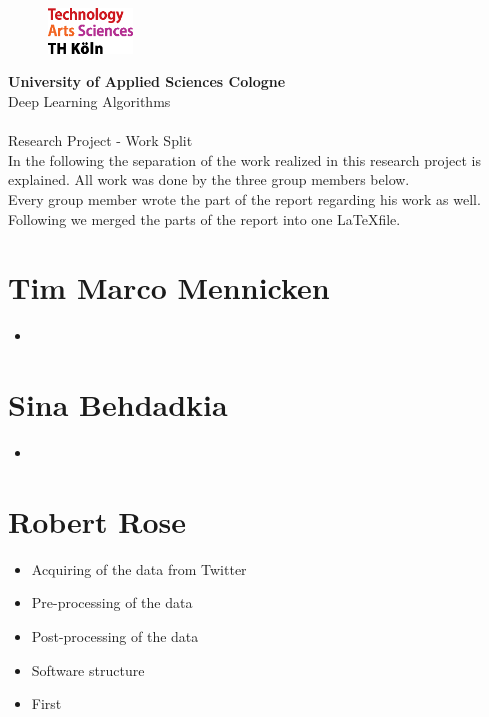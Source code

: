 \documentclass[a4paper,11pt,oneside]{article}
\begin{document}
  \pagestyle{fancy} %
  \fancyhead{}
  \fancyhf{}
  \renewcommand{\headrulewidth}{0pt}
  \renewcommand{\footrulewidth}{0.4pt}
  \fancyfoot[R] {}
  \begin{figure}
    \includegraphics[width=0.2\textwidth]{sources/logo_TH-Koeln_CMYK_22pt}
  \end{figure}
  \Large
  \textbf{University of Applied Sciences Cologne}\\
  Deep Learning Algorithms\\
  \\
  \large
  Research Project - Work Split\\

In the following the separation of the work realized in this research project is explained. All work was done by the three group members below.\\
Every group member wrote the part of the report regarding his work as well. Following we merged the parts of the report into one \LaTeX file.

\section*{Tim Marco Mennicken}

\begin{itemize}
\item
\end{itemize}

\section*{Sina Behdadkia}

\begin{itemize}
\item
\end{itemize}

\section*{Robert Rose}

\begin{itemize}
\item Acquiring of the data from Twitter
\item Pre-processing of the data
\item Post-processing of the data
\item Software structure
\item First 
\end{itemize}
  
\end{document}
